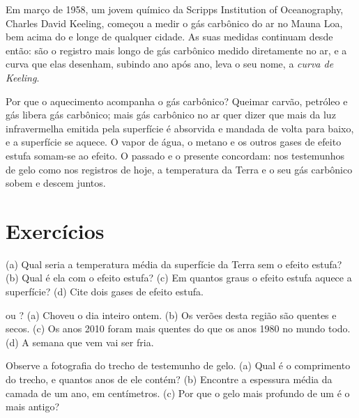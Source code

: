 \begin{history}
Em março de 1958, um jovem químico da Scripps Institution of
Oceanography, Charles David Keeling, começou a medir o gás carbônico do
ar no Mauna Loa, bem acima do  e longe de qualquer cidade. As suas
medidas continuam desde então: são o registro mais longo de gás carbônico
medido diretamente no ar, e a curva que elas desenham, subindo ano após
ano, leva o seu nome, a \emph{curva de Keeling}.
\end{history}

Por que o aquecimento acompanha o gás carbônico? Queimar carvão, petróleo
e gás libera gás carbônico; mais gás carbônico no ar quer dizer que mais
da luz infravermelha emitida pela superfície é absorvida e mandada de
volta para baixo, e a superfície se aquece. O vapor de água, o metano e os
outros gases de efeito estufa somam-se ao efeito. O passado e o presente
concordam: nos testemunhos de gelo como nos registros de hoje, a
temperatura da Terra e o seu gás carbônico sobem e descem juntos.

\section{Exercícios}

\begin{exercise}[$\star$]\label{exo:g9:climate-past-and-present:1}
(a) Qual seria a temperatura média da superfície da Terra sem o efeito
estufa? (b) Qual é ela com o efeito estufa? (c) Em quantos graus o efeito
estufa aquece a superfície? (d) Cite dois gases de efeito estufa.
\end{exercise}

\begin{exercise}[$\star$]\label{exo:g9:climate-past-and-present:2}
 ou ? (a) Choveu o dia inteiro ontem. (b) Os verões desta
região são quentes e secos. (c) Os anos 2010 foram mais quentes do que os
anos 1980 no mundo todo. (d) A semana que vem vai ser fria.
\end{exercise}

\begin{exercise}[$\star$]\label{exo:g9:climate-past-and-present:3}
Observe a fotografia do trecho de testemunho de gelo. (a) Qual é o
comprimento do trecho, e quantos anos de  ele contém? (b) Encontre a
espessura média da camada de um ano, em centímetros. (c) Por que o gelo
mais profundo de um  é o mais antigo?
\end{exercise}

